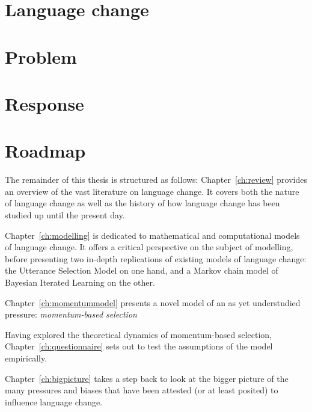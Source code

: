 


\section{Language change}


\section{Problem}




\section{Response}


\section{Roadmap}

The remainder of this thesis is structured as follows: Chapter~\ref{ch:review} provides an overview of the vast literature on language change. It covers both the nature of language change as well as the history of how language change has been studied up until the present day. %

Chapter~\ref{ch:modelling} is dedicated to mathematical and computational models of language change. It offers a critical perspective on the subject of modelling, before presenting two in-depth replications of existing models of language change: the Utterance Selection Model on one hand, and a Markov chain model of Bayesian Iterated Learning on the other.

Chapter~\ref{ch:momentummodel} presents a novel model of an as yet understudied pressure: \emph{momentum-based selection}

Having explored the theoretical dynamics of momentum-based selection, Chapter~\ref{ch:questionnaire} sets out to test the assumptions of the model empirically. %

Chapter~\ref{ch:bigpicture} takes a step back to look at the bigger picture of the many pressures and biases that have been attested (or at least posited) to influence language change.
